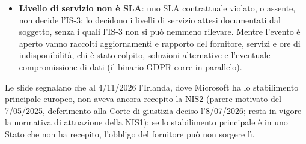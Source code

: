 \begin{itemize}
    notificare al CSIRT Italia tramite il portale ACN con gli orologi 24 h / 72 h / 1 mese; (3) il
    fascicolo di rischio della \textbf{supply chain} (art.~21(2)(d) e~(3)): la dipendenza da un solo
    fornitore è essa stessa un rischio da documentare e monitorare.
  \item \textbf{Livello di servizio non è SLA}: uno SLA contrattuale violato, o assente, non decide
    l'IS-3; lo decidono i livelli di servizio attesi documentati dal soggetto, senza i quali l'IS-3 non
    si può nemmeno rilevare. Mentre l'evento è aperto vanno raccolti aggiornamenti e rapporto del
    fornitore, servizi e ore di indisponibilità, chi è stato colpito, soluzioni alternative e
    l'eventuale compromissione di dati (il binario GDPR corre in parallelo).
\end{itemize}

\begin{nota}
Le slide segnalano che al 4/11/2026 l'Irlanda, dove Microsoft ha lo stabilimento principale europeo,
non aveva ancora recepito la NIS2 (parere motivato del 7/05/2025, deferimento alla Corte di giustizia
deciso l'8/07/2026; resta in vigore la normativa di attuazione della NIS1): se lo stabilimento principale
è in uno Stato che non ha recepito, l'obbligo del fornitore può non sorgere lì.
\end{nota}

